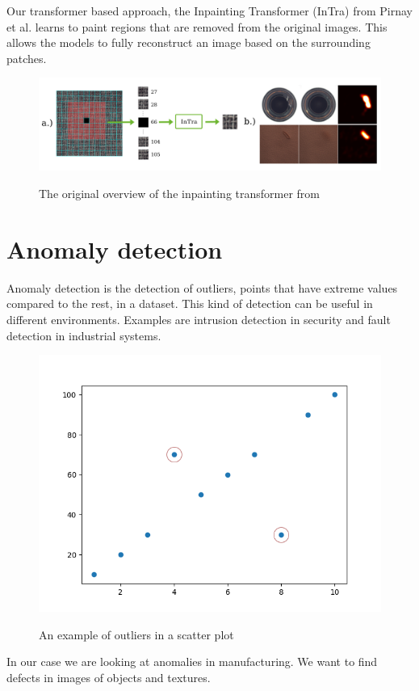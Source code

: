 Our transformer based approach, the Inpainting Transformer (InTra) from Pirnay et al. \cite{pirnay_inpainting_2021} learns to paint regions that are removed from the original images. This allows the models to fully reconstruct an image based on the surrounding patches.

\begin{figure}[h!]
\caption{The original overview of the inpainting transformer from \cite{pirnay_inpainting_2021}}
\centering
\includegraphics[width=\textwidth]{imgs/inpainting-transformer.png}
\label{fig:prelim:intra-overview}
\end{figure}


\section{Anomaly detection}
\label{sec:prelim:anomaly-detection}

Anomaly detection is the detection of outliers, points that have extreme values compared to the rest, in a dataset.
This kind of detection can be useful in different environments. Examples are intrusion detection in security and fault detection in industrial systems.

\begin{figure}[h!]
\caption{An example of outliers in a scatter plot}
\centering
\includegraphics[width=\textwidth]{imgs/outliers-example.png}
\label{fig:prelim:outliers-example}
\end{figure}

In our case we are looking at anomalies in manufacturing. We want to find defects in images of objects and textures.


 
